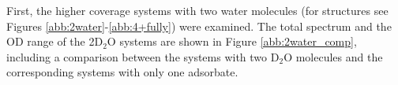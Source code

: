 \documentclass[11pt,DIV=13,BCOR=5mm,a4paper,headinclude]{scrbook}
\begin{document}
First, the higher coverage systems with two water molecules (for structures see Figures \ref{abb:2water}-\ref{abb:4+fully}) were examined.
The total spectrum and the OD range of the 2D$_2$O systems are shown in Figure %
\ref{abb:2water_comp}, including a comparison between the systems with two D$_2$O molecules and the corresponding systems with only one adsorbate.
\end{document}
